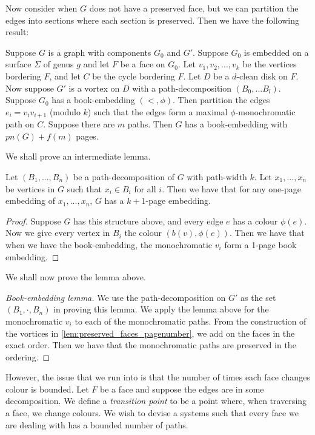 Now consider when $G$ does not have a preserved face, but we can partition the edges into sections where each section is preserved. Then we have the following result:
\begin{lemma}\label{lem:vortices_mono_paths}
	Suppose $G$ is a graph with components $G_0$ and $G'$. Suppose $G_0$ is embedded on a surface $\Sigma$ of genus $g$ and let $F$ be a face on $G_0$. Let $v_1, v_2, ..., v_k$ be the vertices bordering $F$, and let $C$ be the cycle bordering $F$. Let $D$ be a $d$-clean disk on $F$. Now suppose $G'$ is a vortex on $D$ with a path-decomposition $(B_0, ... B_l)$. Suppose $G_0$ has a book-embedding $(<, \phi)$. Then partition the edges $e_i = v_i v_{i + 1}$ (modulo $k$) such that the edges form a maximal $\phi$-monochromatic path on $C$. Suppose there are $m$ paths. Then $G$ has a book-embedding with $pn(G) + f(m)$ pages.
\end{lemma}
We shall prove an intermediate lemma. 
\begin{lemma}
	Let $(B_1, ..., B_n)$ be a path-decomposition of $G$ with path-width $k$. Let $x_1, ..., x_n$ be vertices in $G$ such that $x_i \in B_i$ for all $i$. Then we have that for any one-page embedding of $x_1, ..., x_n$, $G$ has a $k + 1$-page embedding. 
\end{lemma}
\begin{proof}
	Suppose $G$ has this structure above, and every edge $e$ has a colour $\phi(e)$. 
	Now we give every vertex in $B_i$ the colour $(b(v),  \phi(e))$. Then we have that when we have the book-embedding, the monochromatic $v_i$ form a 1-page book embedding.
\end{proof}

We shall now prove the lemma above.
\begin{proof}[Book-embedding lemma]
	We use the path-decomposition on $G'$ as the set $(B_1, \cdot , B_n)$ in proving this lemma. We apply the lemma above for the monochromatic $v_i$ to each of the monochromatic paths. From the construction of the vortices in \cref{lem:preserved_faces_pagenumber}, we add on the faces in the exact order. Then we have that the monochromatic paths are preserved in the ordering. 
\end{proof}

However, the issue that we run into is that the number of times each face changes colour is bounded. Let $F$ be a face and suppose the edges are in some decomposition. We define a \textit{transition point} to be a point where, when traversing a face, we change colours. We wish to devise a systems such that every face we are dealing with has a bounded number of paths.

